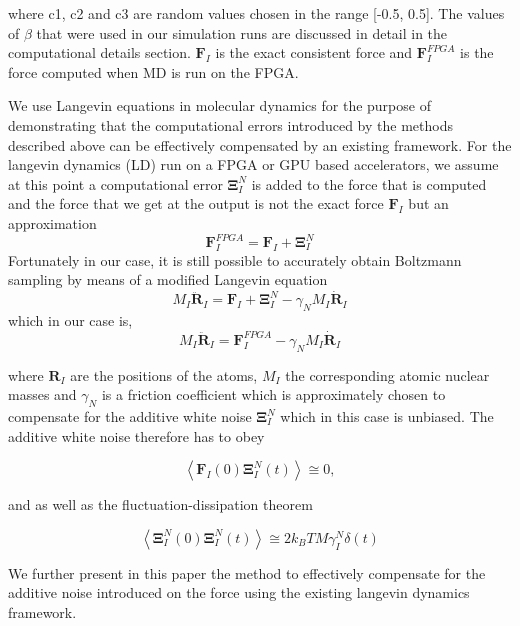 where c1, c2 and c3 are random values chosen in the range [-0.5, 0.5]. The values of \(\beta\) that were used in our simulation runs are discussed in detail in the computational details section. \(\textbf{F}_{I}\) is the exact consistent force and \(\textbf{F}_{I}^{FPGA}\) is the force computed when MD is run on the FPGA.

We use Langevin equations in molecular dynamics for the purpose of demonstrating that the computational errors introduced by the methods described above can be effectively compensated by an existing framework. 
For the langevin dynamics (LD) run on a FPGA or GPU based accelerators, we assume at this point a computational error \(\mathbf{\Xi }_{I}^{N}\) is added to the force that is computed and the force that we get at the output is not the exact force \(\textbf{F}_{I}\) but an approximation
\begin{equation}
\textbf{F}_{I}^{FPGA} = \textbf{F}_{I}+ \mathbf{\Xi }_{I}^{N}
\end{equation} 
Fortunately in our case, it is still possible to accurately obtain Boltzmann sampling by means of a modified Langevin equation 
\begin{equation}
M_{I}\ddot{\textbf{R}}_{I}=\textbf{F}_{I}+\mathbf{\Xi }_{I}^{N}-\gamma _{N}M_{I}\dot{\textbf{R}}_{I} 
\end{equation}
which in our case is,
\begin{equation}
M_{I}\ddot{\textbf{R}}_{I} = \textbf{F}_{I}^{FPGA}-\gamma _{N}M_{I}\dot{\textbf{R}}_{I}
\end{equation}

where \(\textbf{R}_{I}\) are the positions of the atoms, \(M_{I}\) the corresponding atomic nuclear masses and \(\gamma _{N}\) is a friction coefficient which is approximately chosen to compensate for the additive white noise \(\mathbf{\Xi }_{I}^{N}\) which in this case is unbiased.
The additive white noise therefore has to obey

\begin{equation}
 \left \langle \textbf{F}_{I}\left ( 0 \right ) \mathbf{\Xi } _{I}^{N}\left ( t \right )\right \rangle \cong  0,
\end{equation}

and as well as the fluctuation-dissipation theorem

\begin{equation}
\left \langle \mathbf{\Xi } _{I}^{N}\left ( 0 \right ) \mathbf{\Xi } _{I}^{N}\left ( t \right ) \right \rangle \cong  2k_{B}TM\gamma _{I}^{N}\delta \left ( t \right )
\end{equation}  

We further present in this paper the method to effectively compensate for the additive noise introduced on the force using the existing langevin dynamics framework. 
